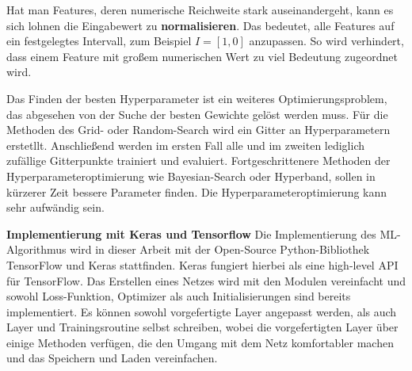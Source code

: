 Hat man Features, deren numerische Reichweite stark auseinandergeht, kann es sich lohnen die Eingabewert zu \textbf{normalisieren}. Das bedeutet, alle Features auf ein festgelegtes Intervall, zum Beispiel $I=[1,0]$ anzupassen. So wird verhindert, dass einem Feature mit großem numerischen Wert zu viel Bedeutung zugeordnet wird.

Das Finden der besten Hyperparameter ist ein weiteres Optimierungsproblem, das abgesehen von der Suche der besten Gewichte gelöst werden muss. Für die Methoden des Grid- oder Random-Search wird ein Gitter an Hyperparametern erstetllt. Anschließend werden im ersten Fall alle und im zweiten lediglich zufällige Gitterpunkte trainiert und evaluiert. Fortgeschrittenere Methoden der Hyperparameteroptimierung wie Bayesian-Search oder Hyperband, sollen in kürzerer Zeit bessere Parameter finden. Die Hyperparameteroptimierung kann sehr aufwändig sein. 

\textbf{Implementierung mit Keras und Tensorflow}
Die Implementierung des ML-Algorithmus wird in dieser Arbeit mit der Open-Source Python-Bibliothek TensorFlow und Keras\cite{Keras} stattfinden. Keras fungiert hierbei als eine high-level API für TensorFlow. Das Erstellen eines Netzes wird mit den Modulen vereinfacht und sowohl Loss-Funktion, Optimizer als auch Initialisierungen sind bereits implementiert. Es können sowohl vorgefertigte Layer angepasst werden, als auch Layer und Trainingsroutine selbst schreiben, wobei die vorgefertigten Layer über einige Methoden verfügen, die den Umgang mit dem Netz komfortabler machen und das Speichern und Laden vereinfachen. 


